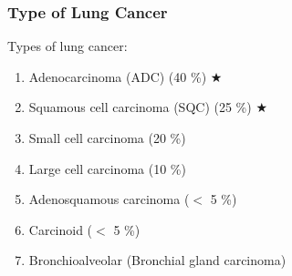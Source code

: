 \documentclass{beamer}
\begin{document}
    \begin{frame}
        \frametitle{Type of Lung Cancer}

        Types of lung cancer:
        \begin{enumerate}
            \item Adenocarcinoma (ADC) (40 \%) $\bigstar$
            \item Squamous cell carcinoma (SQC) (25 \%) $\bigstar$
            \item Small cell carcinoma (20 \%)
            \item Large cell carcinoma (10 \%)
            \item Adenosquamous carcinoma ($<$ 5 \%)
            \item Carcinoid ($<$ 5 \%)
            \item Bronchioalveolar (Bronchial gland carcinoma)
        \end{enumerate}
        \cite{lung1, lung2}
    \end{frame}
\end{document}
